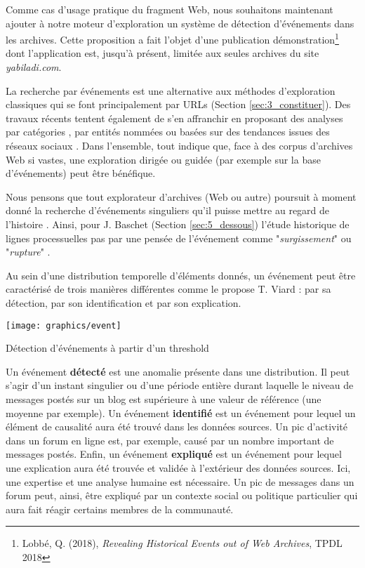 \documentclass[symmetric,justified,marginals=raggedouter]{tufte-book}
\begin{document}
\noindent Comme cas d'usage pratique du fragment Web, nous souhaitons maintenant ajouter à notre moteur d'exploration un système de détection d'événements dans les archives. Cette proposition a fait l'objet d'une publication démonstration\footnote{Lobbé, Q. (2018), \textit{Revealing Historical Events out of Web Archives}, TPDL 2018} dont l'application est, jusqu'à présent, limitée aux seules archives du site \textit{yabiladi.com}. 

La recherche par événements est une alternative aux méthodes d'ex\-ploration classiques qui se font principalement par URLs (Section \ref{sec:3_constituer}). Des travaux récents tentent également de s'en affranchir en proposant des analyses par catégories \citep{holzmann_tempas:_2016}, par entités nommées \citep{spaniol_tracking_2012} ou basées sur des tendances issues des réseaux sociaux \citep{risse_arcomem_2014}. Dans l'ensemble, tout indique que, face à des corpus d'archives Web si vastes, une exploration dirigée ou guidée (par exemple sur la base d'événements) peut être bénéfique. 

Nous pensons que tout explorateur d'archives (Web ou autre) poursuit à moment donné la recherche d'événements singuliers qu'il puisse mettre au regard de l'histoire \citep{chaney_who_2015}. Ainsi, pour J. Baschet (Section \ref{sec:5_dessous}) l'étude historique de lignes processuelles pas par une pensée de l'évé\-nement comme "\textit{surgissement}" ou "\textit{rupture}" \citep[p.227]{baschet_defaire_2018}.  

Au sein d'une distribution temporelle d'éléments donnés, un événement peut être caractérisé de trois manières différentes comme le propose T. Viard \citep[p.106]{viard_link_2016} : par sa détection, par son identification et par son explication. 

\begin{marginfigure}%
  \texttt{[image: graphics/event]}
  \vspace*{0.2cm}  
  \caption{Détection d'événements à partir d'un threshold}
  \label{fig:event}
\end{marginfigure}

Un événement \textbf{détecté} est une anomalie présente dans une distribution. Il peut s'agir d'un instant singulier ou d'une période entière durant laquelle le niveau de messages postés sur un blog est supérieure à une valeur de référence (une moyenne par exemple). Un événement \textbf{identifié} est un événement pour lequel un élément de causalité aura été trouvé dans les données sources. Un pic d'activité dans un forum en ligne est, par exemple, causé par un nombre important de messages postés. Enfin, un événement \textbf{expliqué} est un événement pour lequel une explication aura été trouvée et validée à l'extérieur des données sources. Ici, une expertise et une analyse humaine est nécessaire. Un pic de messages dans un forum peut, ainsi, être expliqué par un contexte social ou politique particulier qui aura fait réagir certains membres de la communauté.  
\end{document}
